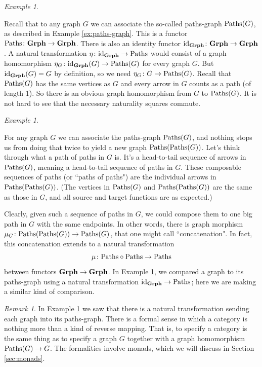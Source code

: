 \documentclass{book}
\def\tn{\textnormal}
\def\Paths{\tn{Paths}}
\def\to{\rightarrow}
\def\taking{\colon}
\def\id{\tn{id}}
\def\Grph{{\bf Grph}}
\theoremstyle{remark}
\newtheorem{remark}[subsubsection]{Remark}
\newtheorem{example}[subsubsection]{Example}
\theoremstyle{definition}
\begin{document}
\begin{example}\label{ex:graph to paths}

Recall that to any graph $G$ we can associate the so-called paths-graph $\Paths(G)$, as described in Example \ref{ex:paths-graph}. This is a functor $\Paths\taking\Grph\to\Grph$.\index{a functor!$\Paths\taking\Grph\to\Grph$} There is also an identity functor $\id_{\Grph}\taking\Grph\to\Grph$. A natural transformation $\eta\taking\id_\Grph\to\Paths$ would consist of a graph homomorphism $\eta_G\taking \id_\Grph(G)\to\Paths(G)$ for every graph $G$. But $\id_\Grph(G)=G$ by definition, so we need $\eta_G\taking G\to\Paths(G)$. Recall that $\Paths(G)$ has the same vertices as $G$ and every arrow in $G$ counts as a path (of length 1). So there is an obvious graph homomorphism from $G$ to $\Paths(G)$. It is not hard to see that the necessary naturality squares commute.

\end{example}

\begin{example}\label{ex:concat paths of paths}

For any graph $G$ we can associate the paths-graph $\Paths(G)$, and nothing stops us from doing that twice to yield a new graph $\Paths(\Paths(G))$. Let's think through what a path of paths in $G$ is. It's a head-to-tail sequence of arrows in $\Paths(G)$, meaning a head-to-tail sequence of paths in $G$. These composable sequences of paths (or ``paths of paths") are the individual arrows in $\Paths(\Paths(G))$. (The vertices in $\Paths(G)$ and $\Paths(\Paths(G))$ are the same as those in $G$, and all source and target functions are as expected.)

Clearly, given such a sequence of paths in $G$, we could compose them to one big path in $G$ with the same endpoints. In other words, there is graph morphism $\mu_G\taking\Paths(\Paths(G))\to\Paths(G)$, that one might call ``concatenation". In fact, this concatenation extends to a natural transformation $$\mu\taking\Paths\circ\Paths\to\Paths$$ between functors $\Grph\to\Grph$. In Example \ref{ex:graph to paths}, we compared a graph to its paths-graph using a natural transformation $\id_{\Grph}\to\Paths$; here we are making a similar kind of comparison.

\end{example}

\begin{remark}

In Example \ref{ex:graph to paths} we saw that there is a natural transformation sending each graph into its paths-graph. There is a formal sense in which a category is nothing more than a kind of reverse mapping. That is, to specify a category is the same thing as to specify a graph $G$ together with a graph homomorphism $\Paths(G)\to G$. The formalities involve monads, which we will discuss in Section \ref{sec:monads}.

\end{remark}
\end{document}
